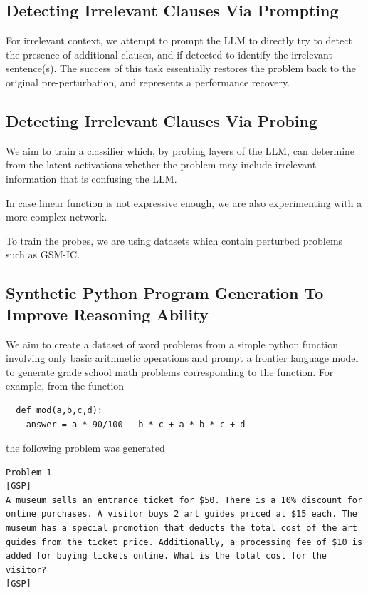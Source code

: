 \documentclass{article}
\begin{document}
\subsection{Detecting Irrelevant Clauses Via Prompting}
For irrelevant context, we attempt to prompt the LLM to directly try to detect the presence of additional clauses, and if detected to identify the irrelevant sentence(s). The success of this task essentially restores the problem back to the original pre-perturbation, and represents a performance recovery.

\subsection{Detecting Irrelevant Clauses Via Probing}
We aim to train a classifier which, by probing layers of the LLM, can determine from the latent activations whether the problem may include irrelevant information that is confusing the LLM. 
 
In case linear function is not expressive enough, we are also experimenting with a more complex network. 

To train the probes, we are using datasets which contain perturbed problems such as GSM-IC.
 
\subsection{Synthetic Python Program Generation To Improve Reasoning Ability}

We aim to create a dataset of word problems from a simple python function involving only basic arithmetic operations and prompt a frontier language model to generate grade school math problems corresponding to the function. For example, from the function 
\begin{center}
\begin{verbatim}
  def mod(a,b,c,d):
    answer = a * 90/100 - b * c + a * b * c + d
\end{verbatim}
\end{center}
the following problem was generated 
\begin{verbatim}
Problem 1
[GSP]  
A museum sells an entrance ticket for $50. There is a 10% discount for
online purchases. A visitor buys 2 art guides priced at $15 each. The 
museum has a special promotion that deducts the total cost of the art
guides from the ticket price. Additionally, a processing fee of $10 is
added for buying tickets online. What is the total cost for the visitor?  
[GSP] 
\end{verbatim}
\end{document}
